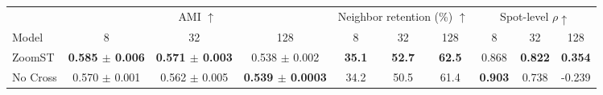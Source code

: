 \begin{tabular}{l*{9}{c}}
\toprule
 & \multicolumn{3}{c}{AMI $\uparrow$} & \multicolumn{3}{c}{Neighbor retention (\%) $\uparrow$} & \multicolumn{3}{c}{Spot-level $\rho\uparrow$} \\
\cmidrule(lr){2-4}\cmidrule(lr){5-7}\cmidrule(lr){8-10}
Model & 8 & 32 & 128 & 8 & 32 & 128 & 8 & 32 & 128 \\
\midrule
ZoomST & \textbf{0.585 $\pm$ 0.006} & \textbf{0.571 $\pm$ 0.003} & 0.538 $\pm$ 0.002 & \textbf{35.1} & \textbf{52.7} & \textbf{62.5} & 0.868 & \textbf{0.822} & \textbf{0.354} \\
No Cross & 0.570 $\pm$ 0.001 & 0.562 $\pm$ 0.005 & \textbf{0.539 $\pm$ 0.0003} & 34.2 & 50.5 & 61.4 & \textbf{0.903} & 0.738 & -0.239 \\
\bottomrule
\end{tabular}
